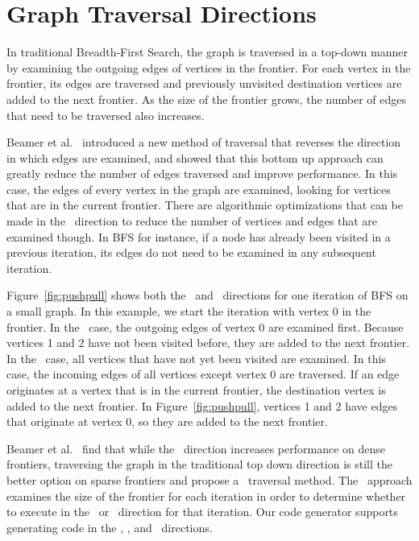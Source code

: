 \section{Graph Traversal Directions}

\pushVPullMethodFigure

In traditional Breadth-First Search, the graph is traversed in a top-down manner by examining the outgoing edges of vertices in the frontier.
For each vertex in the frontier, its edges are traversed and previously unvisited destination vertices are added to the next frontier.
As the size of the frontier grows, the number of edges that need to be traversed also increases.

Beamer et al.~\cite{beamer-bfs-direction} introduced a new method of traversal that reverses the direction in which edges are examined, and showed that this bottom up \pull approach can greatly reduce the number of edges traversed and improve performance. 
In this case, the edges of every vertex in the graph are examined, looking for vertices that are in the current frontier.
There are algorithmic optimizations that can be made in the \pull~direction to reduce the number of vertices and edges that are examined though. 
In BFS for instance, if a node has already been visited in a previous iteration, its edges do not need to be examined in any subsequent iteration.

Figure~\ref{fig:pushpull} shows both the \push~and \pull~directions for one iteration of BFS on a small graph.
In this example, we start the iteration with vertex 0 in the frontier. 
In the \push~case, the outgoing edges of vertex 0 are examined first.
Because vertices 1 and 2 have not been visited before, they are added to the next frontier.
In the \pull~case, all vertices that have not yet been visited are examined.
In this case, the incoming edges of all vertices except vertex 0 are traversed.
If an edge originates at a vertex that is in the current frontier, the destination vertex is added to the next frontier.
In Figure~\ref{fig:pushpull}, vertices 1 and 2 have edges that originate at vertex 0, so they are added to the next frontier. 

Beamer et al.~\cite{beamer-bfs-direction} find that while the \pull~direction increases performance on dense frontiers, traversing the graph in the traditional top down \push direction is still the better option on sparse frontiers and propose a \hybrid~traversal method.
The \hybrid~approach examines the size of the frontier for each iteration in order to determine whether to execute in the \push~or \pull~direction for that iteration.
Our code generator supports generating code in the \pull, \push, and \hybrid~directions.

